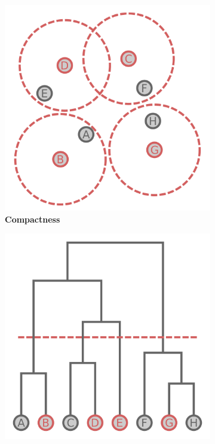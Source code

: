 \begin{figure}
    \begin{adjustbox}{minipage=\dimexpr{}\fboxrule,fbox}
        \begin{subfigure}[b]{0.475\textwidth}
            \includegraphics[width=\textwidth]{Extra_Graphics/Compactness.pdf}
            \caption[Compactness]{\textbf{Compactness}}
            \label{fig:1.0.3a}
        \end{subfigure}
        \hfill
        \begin{subfigure}[b]{0.475\textwidth}
            \includegraphics[width=\textwidth]{Extra_Graphics/Connectedness.pdf}

\end{subfigure}
\end{adjustbox}
\end{figure}

